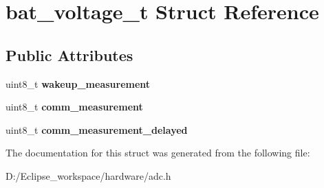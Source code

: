 \hypertarget{structbat__voltage__t}{}\section{bat\+\_\+voltage\+\_\+t Struct Reference}
\label{structbat__voltage__t}
\subsection*{Public Attributes}
\begin{DoxyCompactItemize}
\item 
\hypertarget{structbat__voltage__t_a770fc1e02666ca4990c9ab44fc5c3437}{}uint8\+\_\+t {\bfseries wakeup\+\_\+measurement}\label{structbat__voltage__t_a770fc1e02666ca4990c9ab44fc5c3437}

\item 
\hypertarget{structbat__voltage__t_a5c71becaa1eb37f0afd45e5e313e415a}{}uint8\+\_\+t {\bfseries comm\+\_\+measurement}\label{structbat__voltage__t_a5c71becaa1eb37f0afd45e5e313e415a}

\item 
\hypertarget{structbat__voltage__t_abba0bd8564c57131f0968c256414f6fa}{}uint8\+\_\+t {\bfseries comm\+\_\+measurement\+\_\+delayed}\label{structbat__voltage__t_abba0bd8564c57131f0968c256414f6fa}

\end{DoxyCompactItemize}


The documentation for this struct was generated from the following file\+:\begin{DoxyCompactItemize}
\item 
D\+:/\+Eclipse\+\_\+workspace/hardware/adc.\+h\end{DoxyCompactItemize}
